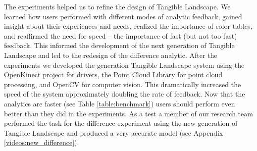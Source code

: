 \documentclass[prodmode,acmtochi]{acmsmall} %
\begin{document}
The experiments helped us to refine the design of Tangible Landscape. 
We learned how users performed with different modes of analytic feedback, 
gained insight about their experiences and needs,
realized the importance of color tables, 
and reaffirmed the need for speed -- 
the importance of fast (but not too fast) feedback. 
This informed the development of the next generation of Tangible Landscape 
and led to the redesign of the difference analytic. 
After the experiments
we developed the  generation Tangible Landscape system
using 
the OpenKinect project for drivers,
the Point Cloud Library for point cloud processing, 
and OpenCV for computer vision. 
This dramatically increased the speed of the system
approximately doubling the rate of feedback.
Now that the analytics are faster (see Table \ref{table:benchmark})
users should perform even better than they did in the experiments.
As a test a member of our research team 
performed the task for the difference experiment 
using the new generation of Tangible Landscape
and produced a very accurate model  
(see Appendix \ref{videos:new_difference}).





% 
%

\end{document}
